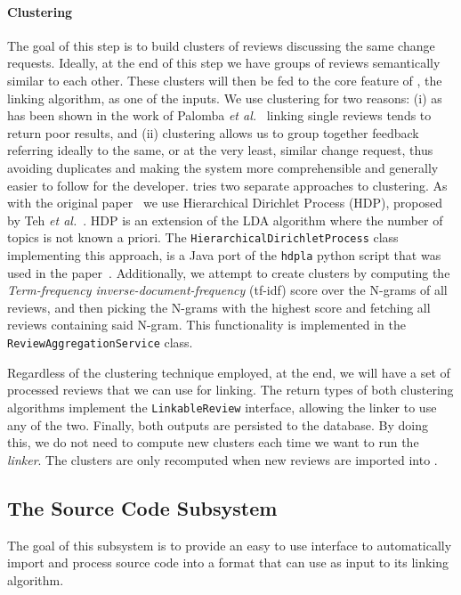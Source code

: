 \paragraph{Clustering}
The goal of this step is to build clusters of reviews discussing the same change requests. Ideally, at the end of this step we have groups of reviews semantically similar to each other. These clusters will then be fed to the core feature of \tool{}, the linking algorithm, as one of the inputs. We use clustering for two reasons: (i) as has been shown in the work of Palomba \textit{et al.}~\cite{Palomba2017} linking single reviews tends to return poor results, and (ii) clustering allows us to group together feedback referring ideally to the same, or at the very least, similar change request, thus avoiding duplicates and making the system more comprehensible and generally easier to follow for the developer. \tool{} tries two separate approaches to clustering. As with the original \tool{} paper~\cite{Palomba2017} we use Hierarchical Dirichlet Process (HDP), proposed by Teh \textit{et al.}~\cite{teh2005sharing}. HDP is an extension of the LDA algorithm where the number of topics is not known a priori. The \texttt{HierarchicalDirichletProcess} class implementing this approach, is a Java port of the \texttt{hdpla} python script that was used in the \tool{} paper~\cite{Palomba2017}.
Additionally, we attempt to create clusters by computing the \textit{Term-frequency inverse-document-frequency} (tf-idf) score over the N-grams of all reviews, and then picking the N-grams with the highest score and fetching all reviews containing said N-gram. This functionality is implemented in the \texttt{ReviewAggregationService} class.

Regardless of the clustering technique employed, at the end, we will have a set of processed reviews that we can use for linking. The return types of both clustering algorithms implement the \texttt{LinkableReview} interface, allowing the linker to use any of the two. Finally, both outputs are persisted to the database. By doing this, we do not need to compute new clusters each time we want to run the \textit{linker}. The clusters are only recomputed when new reviews are imported into \tool{}.

%
%
\subsection{The Source Code Subsystem}

The goal of this subsystem is to provide an easy to use interface to automatically import and process source code into a format that \tool{} can use as input to its linking algorithm. 
